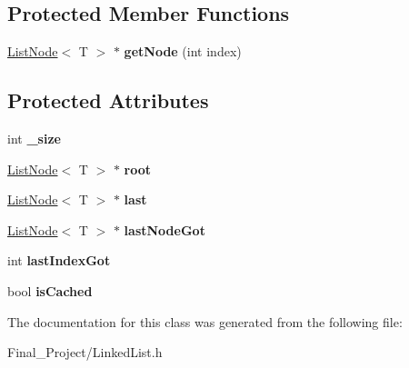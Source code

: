 \subsection*{Protected Member Functions}
\begin{DoxyCompactItemize}
\item 
\hypertarget{classLinkedList_a8ac5df15e0aba36cb279bf2ce0d6b72e}{\hyperlink{structListNode}{List\-Node}$<$ T $>$ $\ast$ {\bfseries get\-Node} (int index)}\label{classLinkedList_a8ac5df15e0aba36cb279bf2ce0d6b72e}

\end{DoxyCompactItemize}
\subsection*{Protected Attributes}
\begin{DoxyCompactItemize}
\item 
\hypertarget{classLinkedList_a1ebc5b9fba5b640b2412172a8ca9464c}{int {\bfseries \-\_\-size}}\label{classLinkedList_a1ebc5b9fba5b640b2412172a8ca9464c}

\item 
\hypertarget{classLinkedList_ae5e0a92c9b9b936a49a4e40a121a2b31}{\hyperlink{structListNode}{List\-Node}$<$ T $>$ $\ast$ {\bfseries root}}\label{classLinkedList_ae5e0a92c9b9b936a49a4e40a121a2b31}

\item 
\hypertarget{classLinkedList_ae21ffbddc0bed9b6bd7799dba7c7e6c9}{\hyperlink{structListNode}{List\-Node}$<$ T $>$ $\ast$ {\bfseries last}}\label{classLinkedList_ae21ffbddc0bed9b6bd7799dba7c7e6c9}

\item 
\hypertarget{classLinkedList_aff769fff999bc5524dac82fa328f2bd8}{\hyperlink{structListNode}{List\-Node}$<$ T $>$ $\ast$ {\bfseries last\-Node\-Got}}\label{classLinkedList_aff769fff999bc5524dac82fa328f2bd8}

\item 
\hypertarget{classLinkedList_a29bcd5966f3e88990007d76c122e22e3}{int {\bfseries last\-Index\-Got}}\label{classLinkedList_a29bcd5966f3e88990007d76c122e22e3}

\item 
\hypertarget{classLinkedList_a9fe65998403cf0c3e48cfce9636e7594}{bool {\bfseries is\-Cached}}\label{classLinkedList_a9fe65998403cf0c3e48cfce9636e7594}

\end{DoxyCompactItemize}


The documentation for this class was generated from the following file\-:\begin{DoxyCompactItemize}
\item 
Final\-\_\-\-Project/Linked\-List.\-h\end{DoxyCompactItemize}
